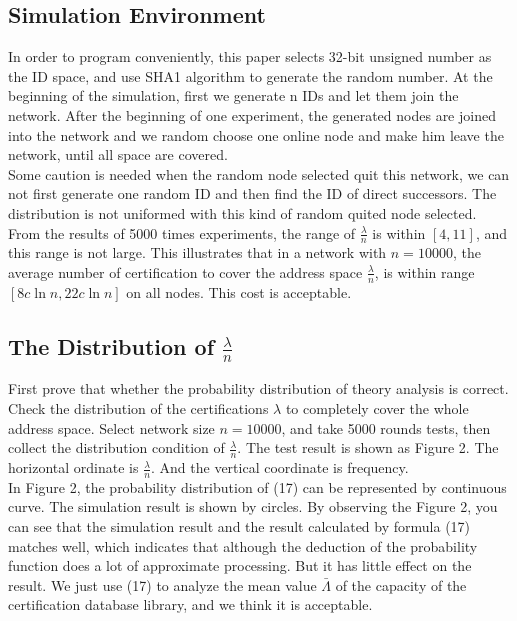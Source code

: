 \documentclass[10pt]{article}
\begin{document}
\subsection{Simulation Environment}
In order to program conveniently, this paper selects 32-bit unsigned number as the ID space, and use SHA1 algorithm to generate the random number. At the beginning of the simulation, first we generate n IDs and let them join the network. After the beginning of one experiment, the generated nodes are joined into the network and we random choose one online node and make him leave the network, until all space are covered. \\
 Some caution is needed when the random node selected quit this network, we can not first generate one random ID and then find the ID of direct successors. The distribution is not uniformed with this kind of random quited node selected. \\
 From the results of 5000 times experiments, the range of $\frac{\lambda}{n}$ is within $[4,11]$, and this range is not large. This illustrates that in a network with $n=10000$, the average number of certification to cover the address space $\frac{\lambda}{n}$, is within range $[8c\ln{n},22c\ln{n}]$ on all nodes. This cost is acceptable.
 \subsection{The Distribution of $\frac{\lambda}{n}$ }
 First prove that whether the probability distribution of theory analysis is correct. Check the distribution of the certifications $\lambda$ to completely cover the whole address space. Select network size $n=10000$, and take 5000 rounds tests, then collect the distribution condition of $\frac{\lambda}{n}$.  The test result is shown as Figure 2. The horizontal ordinate is $\frac{\lambda}{n}$. And the vertical coordinate is frequency. \\
 In Figure 2, the probability distribution of (17) can be represented by continuous curve. The simulation result is shown by circles. By observing the Figure 2, you can see that the   simulation result and the result calculated by formula (17) matches well, which indicates that although the deduction of the probability function does a lot of approximate processing. But it has little effect on  the result. We just use (17) to analyze the mean value $\bar{\Lambda}$ of the capacity of the certification database library, and we think it is acceptable.
\end{document}
